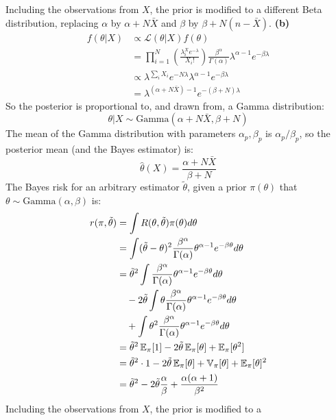 Including the observations from \(X\), the prior is modified to a
different Beta distribution, replacing \(\alpha\) by
\(\alpha + N \bar{X}\) and \(\beta\) by
\(\beta + N(n - \bar{X})\).
\textbf{(b)}
\begin{align*}
f(\theta | X) &\propto \mathcal{L}(\theta | X) f(\theta) \\
&= \prod_{i = 1}^N \left( \frac{\lambda^X_{i} e^{-\lambda}}{X_{i}!} \right) \frac{\beta^\alpha}{\Gamma(\alpha)}\lambda^{\alpha - 1}e^{-\beta \lambda} \\
& \propto \lambda^{\sum_{i} X_{i}} e^{-N \lambda} \lambda^{\alpha - 1} e^{-\beta \lambda} \\
&= \lambda^{\left(\alpha + N \bar{X}\right) - 1} e^{-(\beta + N) \lambda}
\end{align*}
So the posterior is proportional to, and drawn from, a Gamma
distribution:
\[
\theta | X \sim \text{Gamma}\left(\alpha + N \bar{X}, \beta + N \right)
\]
The mean of the Gamma distribution with parameters \(\alpha_p, \beta_p\)
is \(\alpha_p / \beta_p\), so the posterior mean (and the Bayes
estimator) is:
\[
\hat{\theta}(X) = \frac{\alpha + N \bar{X}}{\beta + N}
\]
The Bayes risk for an arbitrary estimator \(\tilde{\theta}\), given a
prior \(\pi(\theta)\) that \(\theta \sim \text{Gamma}(\alpha, \beta)\)
is:
\begin{align*}
r(\pi, \tilde{\theta}) 
&= \int R(\theta, \tilde{\theta})\pi(\theta) d\theta 
\\
&= \int (\tilde{\theta} - \theta)^{2} \frac{\beta^\alpha}{\Gamma(\alpha)} \theta^{\alpha - 1}e^{-\beta \theta} d\theta 
\\
&= \tilde{\theta}^{2} \int \frac{\beta^\alpha}{\Gamma(\alpha)} \theta^{\alpha - 1}e^{-\beta \theta} d\theta
\\
& \quad
- 2 \tilde{\theta} \int \theta \frac{\beta^\alpha}{\Gamma(\alpha)} \theta^{\alpha - 1}e^{-\beta \theta} d\theta
\\
& \quad
+ \int \theta^{2}\frac{\beta^\alpha}{\Gamma(\alpha)} \theta^{\alpha - 1}e^{-\beta \theta} d\theta 
\\
&= \tilde{\theta}^{2} \operatorname{\mathbb{E}}_\pi[1] - 2 \tilde{\theta} \operatorname{\mathbb{E}}_\pi[\theta] + \operatorname{\mathbb{E}}_\pi[\theta^{2}] 
\\
&= \tilde{\theta}^{2} \cdot 1 - 2 \tilde{\theta} \operatorname{\mathbb{E}}_\pi[\theta] + \operatorname{\mathbb{V}}_\pi[\theta] + \operatorname{\mathbb{E}}_\pi[\theta]^{2} 
\\
&= \tilde{\theta}^{2} - 2 \tilde{\theta} \frac{\alpha}{\beta} + \frac{\alpha(\alpha + 1)}{\beta^{2}}
\end{align*}
Including the observations from \(X\), the prior is modified to a

